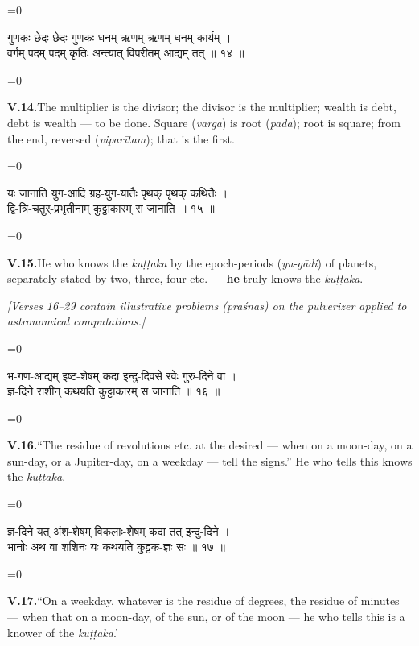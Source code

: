 \documentclass[11pt,a4paper]{article}
\newcommand{\cnote}[1]{\textcolor{notecolor}{\textit{#1}}}
\newcommand{\dev}[1]{{\devanagarifont\color{sktcolor}#1}}
\newcommand{\iast}[1]{\textit{#1}}
\newenvironment{paracol}[1]{\begingroup}{\endgroup}
\newcommand{\switchcolumn}[1][]{%
  \ifnum#1=0\relax\else\par\nobreak\vspace{0.5em}\par\nobreak\fi%
}
\begin{document}
\vspace{0.3cm}

\begin{paracol}{2}
\switchcolumn[0]
\dev{%
गुणकः छेदः छेदः गुणकः धनम् ऋणम् ऋणम् धनम् कार्यम् ।\\
वर्गम् पदम् पदम् कृतिः अन्त्यात् विपरीतम् आद्यम् तत् ॥ १४ ॥
}

\switchcolumn[1]
\textbf{V.14.}\quad The multiplier is the divisor; the divisor is
the multiplier; wealth is debt, debt is wealth — to be done.
Square (\iast{varga}) is root (\iast{pada}); root is square; from
the end, reversed (\iast{viparītam}); that is the first.
\end{paracol}

\vspace{0.3cm}

\begin{paracol}{2}
\switchcolumn[0]
\dev{%
यः जानाति युग-आदि ग्रह-युग-यातैः पृथक् पृथक् कथितैः ।\\
द्वि-त्रि-चतुर्-प्रभृतीनाम् कुट्टाकारम् स जानाति ॥ १५ ॥
}

\switchcolumn[1]
\textbf{V.15.}\quad He who knows the \iast{kuṭṭaka} by the
epoch-periods (\iast{yu-gādi}) of planets, separately stated by
two, three, four etc. — \textbf{he} truly knows the
\iast{kuṭṭaka}.
\end{paracol}

\vspace{0.5cm}
\cnote{[Verses 16–29 contain illustrative problems (\iast{praśna}s) on
the pulverizer applied to astronomical computations.]}
\vspace{0.5cm}

\begin{paracol}{2}
\switchcolumn[0]
\dev{%
भ-गण-आद्यम् इष्ट-शेषम् कदा इन्दु-दिवसे रवेः गुरु-दिने वा ।\\
ज्ञ-दिने राशीन् कथयति कुट्टाकारम् स जानाति ॥ १६ ॥
}

\switchcolumn[1]
\textbf{V.16.}\quad ``The residue of revolutions etc.
at the desired — when on a moon-day, on a sun-day, or a Jupiter-day,
on a weekday — tell the signs.'' He who tells this knows the
\iast{kuṭṭaka}.
\end{paracol}

\vspace{0.3cm}

\begin{paracol}{2}
\switchcolumn[0]
\dev{%
ज्ञ-दिने यत् अंश-शेषम् विकलाः-शेषम् कदा तत् इन्दु-दिने ।\\
भानोः अथ वा शशिनः यः कथयति कुट्टक-ज्ञः सः ॥ १७ ॥
}

\switchcolumn[1]
\textbf{V.17.}\quad ``On a weekday, whatever is the residue of
degrees, the residue of minutes — when that on a moon-day, of
the sun, or of the moon — he who tells this is a knower of the
\iast{kuṭṭaka}.'
\end{paracol}
\end{document}
